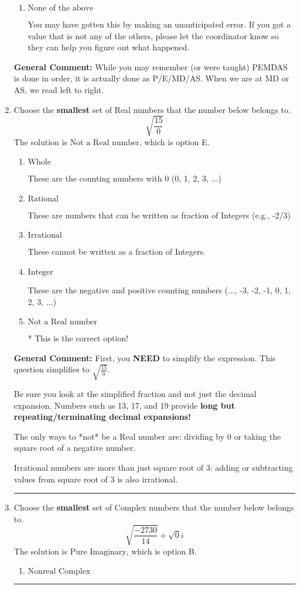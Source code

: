 \documentclass{extbook}[14pt]
\newcommand{\litem}[1]{\item #1

\rule{\textwidth}{0.4pt}}
\begin{document}
\begin{enumerate}
{\begin{enumerate}[label=\Alph*.]
* -94.071, which is the correct option.
\item \( \text{None of the above} \)

 You may have gotten this by making an unanticipated error. If you got a value that is not any of the others, please let the coordinator know so they can help you figure out what happened.
\end{enumerate}

\textbf{General Comment:} While you may remember (or were taught) PEMDAS is done in order, it is actually done as P/E/MD/AS. When we are at MD or AS, we read left to right.
}
\litem{
Choose the \textbf{smallest} set of Real numbers that the number below belongs to.
\[ \sqrt{\frac{15}{0}} \]The solution is \( \text{Not a Real number} \), which is option E.\begin{enumerate}[label=\Alph*.]
\item \( \text{Whole} \)

These are the counting numbers with 0 (0, 1, 2, 3, ...)
\item \( \text{Rational} \)

These are numbers that can be written as fraction of Integers (e.g., -2/3)
\item \( \text{Irrational} \)

These cannot be written as a fraction of Integers.
\item \( \text{Integer} \)

These are the negative and positive counting numbers (..., -3, -2, -1, 0, 1, 2, 3, ...)
\item \( \text{Not a Real number} \)

* This is the correct option!
\end{enumerate}

\textbf{General Comment:} First, you \textbf{NEED} to simplify the expression. This question simplifies to $\sqrt{\frac{15}{0}}$. 
 
 Be sure you look at the simplified fraction and not just the decimal expansion. Numbers such as 13, 17, and 19 provide \textbf{long but repeating/terminating decimal expansions!} 
 
 The only ways to *not* be a Real number are: dividing by 0 or taking the square root of a negative number. 
 
 Irrational numbers are more than just square root of 3: adding or subtracting values from square root of 3 is also irrational.
}
\litem{
Choose the \textbf{smallest} set of Complex numbers that the number below belongs to.
\[ \sqrt{\frac{-2730}{14}}+\sqrt{0}i \]The solution is \( \text{Pure Imaginary} \), which is option B.\begin{enumerate}[label=\Alph*.]
\item \( \text{Nonreal Complex} \)


\end{enumerate}}
\end{enumerate}
\end{document}

